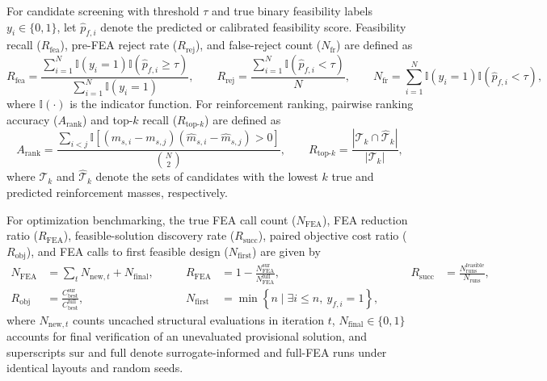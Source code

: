 For candidate screening with threshold $\tau$ and true binary feasibility labels $y_i \in \{0,1\}$, let $\hat{p}_{f,i}$ denote the predicted or calibrated feasibility score. Feasibility recall ($R_{\mathrm{fea}}$), pre-FEA reject rate ($R_{\mathrm{rej}}$), and false-reject count ($N_{\mathrm{fr}}$) are defined as
\begin{equation}
R_{\mathrm{fea}} = \frac{\sum_{i=1}^{N}\mathbb{I}(y_i=1)\mathbb{I}(\hat{p}_{f,i}\geq \tau)}{\sum_{i=1}^{N}\mathbb{I}(y_i=1)}, \qquad
R_{\mathrm{rej}} = \frac{\sum_{i=1}^{N}\mathbb{I}(\hat{p}_{f,i}<\tau)}{N}, \qquad
N_{\mathrm{fr}} = \sum_{i=1}^{N}\mathbb{I}(y_i=1)\mathbb{I}(\hat{p}_{f,i}<\tau),
\label{eq:app_screening_metrics}
\end{equation}
where $\mathbb{I}(\cdot)$ is the indicator function. For reinforcement ranking, pairwise ranking accuracy ($A_{\mathrm{rank}}$) and top-$k$ recall ($R_{\mathrm{top}\text{-}k}$) are defined as
\begin{equation}
A_{\mathrm{rank}} = \frac{\sum_{i<j}\mathbb{I}\!\left[(m_{s,i}-m_{s,j})(\hat{m}_{s,i}-\hat{m}_{s,j}) > 0\right]}{\binom{N}{2}}, \qquad
R_{\mathrm{top}\text{-}k} = \frac{|\mathcal{T}_k \cap \hat{\mathcal{T}}_k|}{|\mathcal{T}_k|},
\label{eq:app_ranking_metrics}
\end{equation}
where $\mathcal{T}_k$ and $\hat{\mathcal{T}}_k$ denote the sets of candidates with the lowest $k$ true and predicted reinforcement masses, respectively.

For optimization benchmarking, the true FEA call count ($N_{\mathrm{FEA}}$), FEA reduction ratio ($R_{\mathrm{FEA}}$), feasible-solution discovery rate ($R_{\mathrm{succ}}$), paired objective cost ratio ($R_{\mathrm{obj}}$), and FEA calls to first feasible design ($N_{\mathrm{first}}$) are given by
\begin{equation}
\begin{aligned}
N_{\mathrm{FEA}} &= \sum_{t}N_{\mathrm{new},t} + N_{\mathrm{final}}, &\qquad
R_{\mathrm{FEA}} &= 1 - \frac{N_{\mathrm{FEA}}^{\mathrm{sur}}}{N_{\mathrm{FEA}}^{\mathrm{full}}}, &\qquad
R_{\mathrm{succ}} &= \frac{N_{\mathrm{runs}}^{\mathrm{feasible}}}{N_{\mathrm{runs}}}, \\
R_{\mathrm{obj}} &= \frac{C_{\mathrm{best}}^{\mathrm{sur}}}{C_{\mathrm{best}}^{\mathrm{full}}}, &\qquad
N_{\mathrm{first}} &= \min\left\{n \mid \exists i \leq n,\ y_{f,i}=1\right\},
\end{aligned}
\label{eq:app_optimization_metrics}
\end{equation}
where $N_{\mathrm{new},t}$ counts uncached structural evaluations in iteration $t$, $N_{\mathrm{final}} \in \{0,1\}$ accounts for final verification of an unevaluated provisional solution, and superscripts $\mathrm{sur}$ and $\mathrm{full}$ denote surrogate-informed and full-FEA runs under identical layouts and random seeds.


